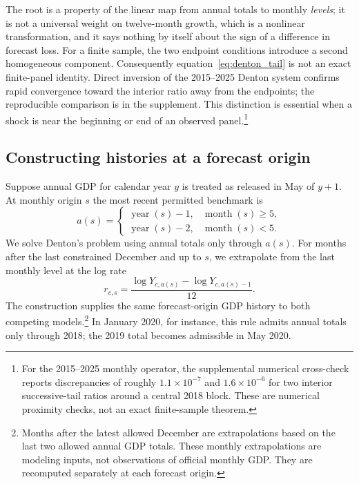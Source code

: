 \documentclass[preprint,12pt,authoryear]{elsarticle}
\begin{document}
The root is a property of the linear map from annual totals to monthly \emph{levels}; it is not a universal weight on twelve-month growth, which is a nonlinear transformation, and it says nothing by itself about the sign of a difference in forecast loss. For a finite sample, the two endpoint conditions introduce a second homogeneous component. Consequently equation~\eqref{eq:denton_tail} is not an exact finite-panel identity. Direct inversion of the 2015--2025 Denton system confirms rapid convergence toward the interior ratio away from the endpoints; the reproducible comparison is in the supplement. This distinction is essential when a shock is near the beginning or end of an observed panel.\footnote{For the 2015--2025 monthly operator, the supplemental numerical cross-check reports discrepancies of roughly $1.1\times10^{-7}$ and $1.6\times10^{-6}$ for two interior successive-tail ratios around a central 2018 block. These are numerical proximity checks, not an exact finite-sample theorem.}

\subsection{Constructing histories at a forecast origin}

Suppose annual GDP for calendar year $y$ is treated as released in May of $y+1$. At monthly origin $s$ the most recent permitted benchmark is
\begin{equation}
a(s)=\begin{cases}
\operatorname{year}(s)-1,&\operatorname{month}(s)\geq5,\\
\operatorname{year}(s)-2,&\operatorname{month}(s)<5.
\end{cases}
\label{eq:availyear}
\end{equation}
We solve Denton's problem using annual totals only through $a(s)$. For months after the last constrained December and up to $s$, we extrapolate from the last monthly level at the log rate
\begin{equation}
r_{c,s}=\frac{\log Y_{c,a(s)}-\log Y_{c,a(s)-1}}{12}.
\label{eq:extraprate}
\end{equation}
The construction supplies the same forecast-origin GDP history to both competing models.\footnote{Months after the latest allowed December are extrapolations based on the last two allowed annual GDP totals. These monthly extrapolations are modeling inputs, not observations of official monthly GDP. They are recomputed separately at each forecast origin.} In January 2020, for instance, this rule admits annual totals only through 2018; the 2019 total becomes admissible in May 2020.
\end{document}
